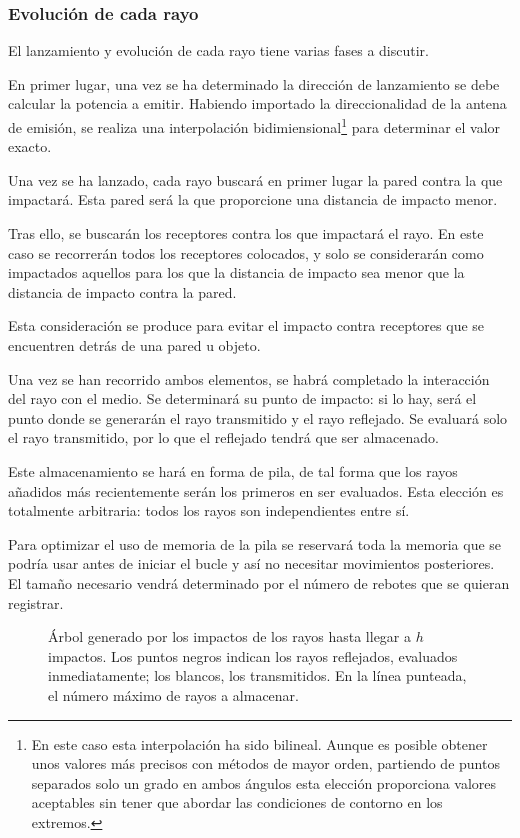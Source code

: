 \subsubsection*{Evolución de cada rayo}

El lanzamiento y evolución de cada rayo tiene varias fases a discutir.

En primer lugar, una vez se ha determinado la dirección de lanzamiento se debe calcular la potencia a emitir.
Habiendo importado la direccionalidad de la antena de emisión, se realiza una interpolación bidimiensional\footnote{En este caso esta interpolación ha sido bilineal. Aunque es posible obtener unos valores más precisos con métodos de mayor orden, partiendo de puntos separados solo un grado en ambos ángulos esta elección proporciona valores aceptables sin tener que abordar las condiciones de contorno en los extremos.} para determinar el valor exacto.

Una vez se ha lanzado, cada rayo buscará en primer lugar la pared contra la que impactará.
Esta pared será la que proporcione una distancia de impacto menor.

Tras ello, se buscarán los receptores contra los que impactará el rayo.
En este caso se recorrerán todos los receptores colocados, y solo se considerarán como impactados aquellos para los que la distancia de impacto sea menor que la distancia de impacto contra la pared.

Esta consideración se produce para evitar el impacto contra receptores que se encuentren detrás de una pared u objeto.

Una vez se han recorrido ambos elementos, se habrá completado la interacción del rayo con el medio.
Se determinará su punto de impacto: si lo hay, será el punto donde se generarán el rayo transmitido y el rayo reflejado.
Se evaluará solo el rayo transmitido, por lo que el reflejado tendrá que ser almacenado.

Este almacenamiento se hará en forma de pila, de tal forma que los rayos añadidos más recientemente serán los primeros en ser evaluados.
Esta elección es totalmente arbitraria: todos los rayos son independientes entre sí.

Para optimizar el uso de memoria de la pila se reservará toda la memoria que se podría usar antes de iniciar el bucle y así no necesitar movimientos posteriores.
El tamaño necesario vendrá determinado por el número de rebotes que se quieran registrar.

\begin{figure}[H]
    \centering
    
    \caption{Árbol generado por los impactos de los rayos hasta llegar a $h$ impactos. Los puntos negros indican los rayos reflejados, evaluados inmediatamente; los blancos, los transmitidos. En la línea punteada, el número máximo de rayos a almacenar.}
    \label{fig:memoria_pila}
\end{figure}

